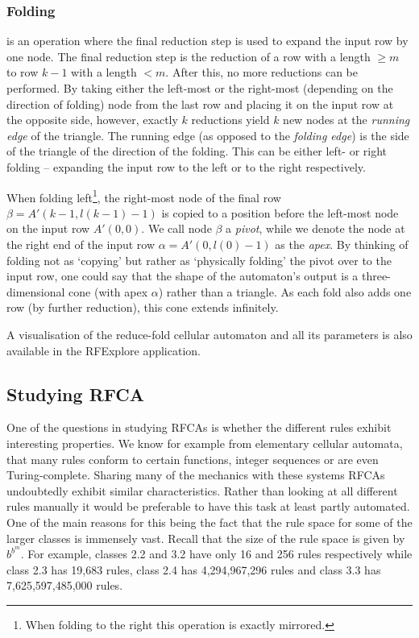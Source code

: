 \documentclass{llncs}
\begin{document}
\subsubsection{Folding} is an operation where the final reduction step is used to expand the input row by one node. The final reduction step is the reduction of a row with a length $\geq m$ to row $k-1$ with a length $<m$. After this, no more reductions can be performed. By taking either the left-most or the right-most (depending on the direction of folding) node from the last row and placing it on the input row at the opposite side, however, exactly $k$ reductions yield $k$ new nodes at the \emph{running edge} of the triangle. The running edge (as opposed to the \emph{folding edge}) is the side of the triangle of the direction of the folding. This can be either left- or right folding -- expanding the input row to the left or to the right respectively.

When folding left\footnote{When folding to the right this operation is exactly mirrored.}, the right-most node of the final row $\beta = A'(k-1,l(k-1)-1)$ is copied to a position before the left-most node on the input row $A'(0,0)$. We call node $\beta$ a \emph{pivot}, while we denote the node at the right end of the input row $\alpha=A'(0,l(0)-1)$ as the \emph{apex}. By thinking of folding not as `copying' but rather as `physically folding' the pivot over to the input row, one could say that the shape of the automaton's output is a three-dimensional cone (with apex $\alpha$) rather than a triangle. As each fold also adds one row (by further reduction), this cone extends infinitely.

A visualisation of the reduce-fold cellular automaton and all its parameters is also available in the RFExplore application\cite{rfexplore}.

\subsection{Studying RFCA}
One of the questions in studying RFCAs is whether the different rules exhibit interesting properties. We know for example from elementary cellular automata, that many rules conform to certain functions, integer sequences\cite{elemca} or are even Turing-complete\cite{cook}. Sharing many of the mechanics with these systems RFCAs undoubtedly exhibit similar characteristics. Rather than looking at all different rules manually it would be preferable to have this task at least partly automated.
One of the main reasons for this being the fact that the rule space for some of the larger classes is immensely vast. Recall that the size of the rule space is given by $b^{b^m}$. For example, classes 2.2 and 3.2 have only 16 and 256 rules respectively while class 2.3 has 19,683 rules, class 2.4 has 4,294,967,296 rules and class 3.3 has 7,625,597,485,000 rules.
\end{document}
